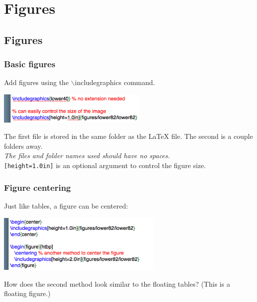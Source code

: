 \documentclass[slidestop,compress,mathserif]{beamer}
\begin{document}
\section[Figures]{Figures}
\subsection[Figures]{Figures}
\begin{frame} \frametitle{Basic figures}
	Add figures using the {\color{command}$\backslash$includegraphics} command.
	\begin{center}
	\includegraphics[height=15mm]{basicsOfLatex/figures/basicFigures}
	\end{center}
	The first file is stored in the same folder as the LaTeX file. The second is a couple folders away.
	\vspace{0.5cm} \\
	\emph{The files and folder names used should have no spaces.}
	\vspace{0.5cm} \\
	\texttt{[height=1.0in]} is an optional argument to control the figure size.
\end{frame}

\begin{frame} \frametitle{Figure centering}
	Just like tables, a figure can be centered:
	\begin{center}
	\includegraphics[height=1.1in]{basicsOfLatex/figures/centerFigure}
	\end{center}
	How does the second method look similar to the floating tables? (This is a floating figure.)
\end{frame}
\end{document}
